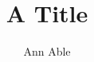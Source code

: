 \documentclass{elsarticle}

\begin{frontmatter}
\title{A Title}
\author{Ann Able}
\begin{abstract}[Summary]
Text of the abstract.
\end{abstract}
\end{frontmatter}
Body.

